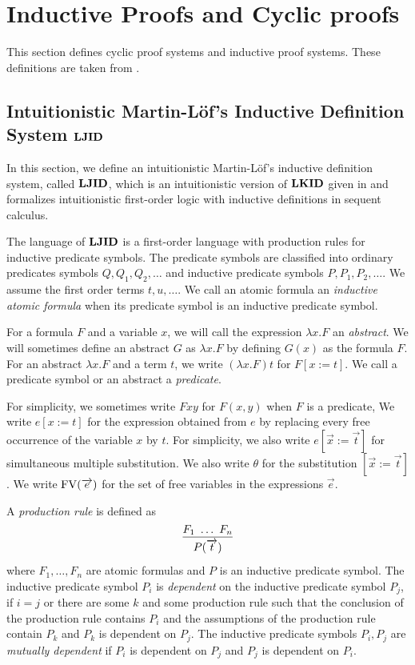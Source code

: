 \section{Inductive Proofs and Cyclic proofs}

This section defines cyclic proof systems and inductive proof systems.
These definitions are taken from \cite{Brotherston11,Berardi17a,Berardi18}.

\subsection{Intuitionistic Martin-L\"of's Inductive Definition System ${\bf LJID}$}

In this section,
we define
an intuitionistic Martin-L\"of's inductive definition system, called ${\bf LJID}$,
which is an intuitionistic version of ${\bf LKID}$ given in \cite{Brotherston11}
and formalizes intuitionistic first-order logic with inductive definitions
in sequent calculus.

The language of ${\bf LJID}$ is a first-order language with
production rules for inductive predicate symbols.
The predicate symbols are classified into ordinary predicates symbols $Q,Q_1,Q_2,\ldots$
and inductive predicate symbols $P,P_1,P_2,\ldots$.
We assume the first order terms $t,u, \ldots$.
We call an atomic formula an {\em inductive atomic formula}
when its predicate symbol is an inductive predicate symbol.

For a formula $F$ and a variable $x$,
we will call the expression $\lambda x.F$ an {\em abstract}.
We will sometimes define an abstract $G$ as $\lambda x.F$
by defining $G(x)$ as the formula $F$.
For an abstract $\lambda x.F$ and a term $t$,
we write $(\lambda x.F)t$ for $F[x:=t]$.
We call a predicate symbol or an abstract a {\em predicate}.

For simplicity,
we sometimes write $Fxy$ for $F(x,y)$ when $F$ is a predicate,
We write $e[x:=t]$ for the expression obtained from $e$ by replacing
every free occurrence of the variable $x$ by $t$.
For simplicity,
we also write $e[\Vec x:=\Vec t]$ for simultaneous multiple substitution.
We also write $\theta$ for the substitution $[\Vec x:=\Vec t]$.
We write ${{\rm FV}}(\overrightarrow e)$ for the set of free variables in the expressions $\Vec e$.

A {\em production rule} is defined as
\[
\infer{P(\Vec t)}{
F_1 \ \ldots \ F_n
}
\]
where $F_1,\ldots,F_n$ are atomic formulas and
$P$ is an inductive predicate symbol.
The inductive predicate symbol $P_i$ is {\em dependent} on 
the inductive predicate symbol $P_j$,
if
$i=j$ or
there are some $k$ and some production rule
such that 
the conclusion of the production rule contains $P_i$ and
the assumptions of the production rule contain $P_k$
and $P_k$ is dependent on $P_j$.
The inductive predicate symbols $P_i,P_j$ are {\em mutually dependent}
if $P_i$ is dependent on $P_j$ and $P_j$ is dependent on $P_i$.

